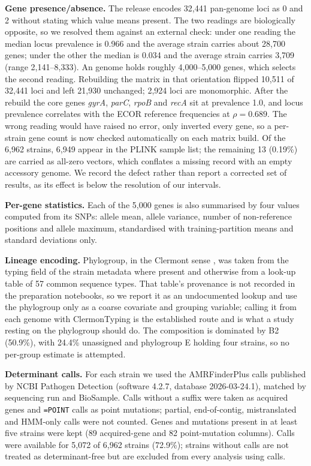 \textbf{Gene presence/absence.} The release encodes 32,441 pan-genome loci as 0 and 2 without
stating which value means present. The two readings are biologically opposite, so we resolved them
against an external check: under one reading the median locus prevalence is 0.966 and the average
strain carries about 28,700 genes; under the other the median is 0.034 and the average strain
carries 3,709 (range 2,141--8,333). An \Ecoli{} genome holds roughly 4,000--5,000 genes, which
selects the second reading. Rebuilding the matrix in that orientation flipped 10,511 of 32,441
loci and left 21,930 unchanged; 2,924 loci are monomorphic. After the rebuild the core genes
\textit{gyrA}, \textit{parC}, \textit{rpoB} and \textit{recA} sit at prevalence 1.0, and locus
prevalence correlates with the ECOR reference frequencies at $\rho = 0.689$. The wrong reading
would have raised no error, only inverted every gene, so a per-strain gene count is now checked
automatically on each matrix build. Of the 6,962 strains, 6,949 appear in the PLINK sample list;
the remaining 13 (0.19\%) are carried as all-zero vectors, which conflates a missing record with an
empty accessory genome. We record the defect rather than report a corrected set of results, as its
effect is below the resolution of our intervals.

\textbf{Per-gene statistics.} Each of the 5,000 genes is also summarised by four values computed
from its SNPs: allele mean, allele variance, number of non-reference positions and allele maximum,
standardised with training-partition means and standard deviations only.

\textbf{Lineage encoding.} Phylogroup, in the Clermont sense \cite{clermont2013phylotyping}, was
taken from the typing field of the strain metadata where present and otherwise from a look-up table
of 57 common sequence types. That table's provenance is not recorded in the preparation notebooks,
so we report it as an undocumented lookup and use the phylogroup only as a coarse covariate and
grouping variable; calling it from each genome with ClermonTyping \cite{beghain2018clermontyping}
is the established route and is what a study resting on the phylogroup should do. The composition
is dominated by B2 (50.9\%), with 24.4\% unassigned and phylogroup E holding four strains, so no
per-group estimate is attempted.

\textbf{Determinant calls.} For each strain we used the AMRFinderPlus
\cite{feldgarden2019amrfinder,feldgarden2021amrfinderplus} calls published by NCBI Pathogen
Detection \cite{ncbi_pathogen_detection} (software 4.2.7, database 2026-03-24.1), matched by
sequencing run and BioSample. Calls without a suffix were taken as acquired genes and
\texttt{=POINT} calls as point mutations; partial, end-of-contig, mistranslated and HMM-only calls
were not counted. Genes and mutations present in at least five strains were kept (89 acquired-gene
and 82 point-mutation columns). Calls were available for 5,072 of 6,962 strains (72.9\%); strains
without calls are not treated as determinant-free but are excluded from every analysis using calls.

